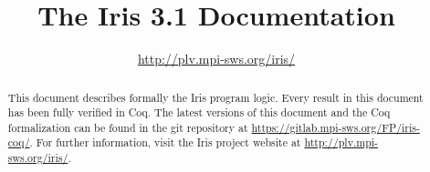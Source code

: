 \documentclass[10pt]{article}
\title{\bfseries The Iris 3.1 Documentation}
\author{\url{http://plv.mpi-sws.org/iris/}}
\begin{document}
\maketitle
\thispagestyle{empty}
\vfill
\begin{abstract}
This document describes formally the Iris program logic.
Every result in this document has been fully verified in Coq.
The latest versions of this document and the Coq formalization can be found in the git repository at \url{https://gitlab.mpi-sws.org/FP/iris-coq/}.
For further information, visit the Iris project website at \url{http://plv.mpi-sws.org/iris/}.
\end{abstract}

\clearpage
\tableofcontents

\clearpage\begingroup

\endgroup\clearpage\begingroup

\endgroup\clearpage\begingroup

\endgroup\clearpage\begingroup

\endgroup\clearpage\begingroup

\endgroup\clearpage\begingroup

\endgroup\clearpage\begingroup

\endgroup\clearpage\begingroup

\endgroup\clearpage\begingroup

\endgroup\clearpage\begingroup
\printbibliography
\endgroup
\end{document}
